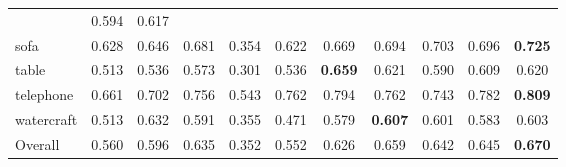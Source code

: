 \documentclass[twocolumn]{svjour3}
\begin{document}
\begin{table*}[!t]
{\begin{tabular}{lcccccccccc}
                   & 0.594      & 0.617 \\
      sofa         & 0.628      & 0.646      & 0.681
                   & 0.354      & 0.622      & 0.669
                   & 0.694      & 0.703
                   & 0.696      & \bf{0.725} \\
      table        & 0.513      & 0.536      & 0.573
                   & 0.301      & 0.536      & \bf{0.659}
                   & 0.621      & 0.590
                   & 0.609      & 0.620 \\
      telephone    & 0.661      & 0.702      & 0.756
                   & 0.543      & 0.762      & 0.794
                   & 0.762      & 0.743
                   & 0.782      & \bf{0.809} \\
      watercraft   & 0.513      & 0.632      & 0.591
                   & 0.355      & 0.471      & 0.579
                   & \bf{0.607} & 0.601
                   & 0.583      & 0.603 \\
      \midrule
      Overall      & 0.560      & 0.596      & 0.635
                   & 0.352      & 0.552      & 0.626
                   & 0.659      & 0.642
                   & 0.645      & \bf{0.670} \\
      \bottomrule
    \end{tabular}
  }
  \label{tab:shapenet-voxel-reconstruction-iou}
\end{table*}
\end{document}
